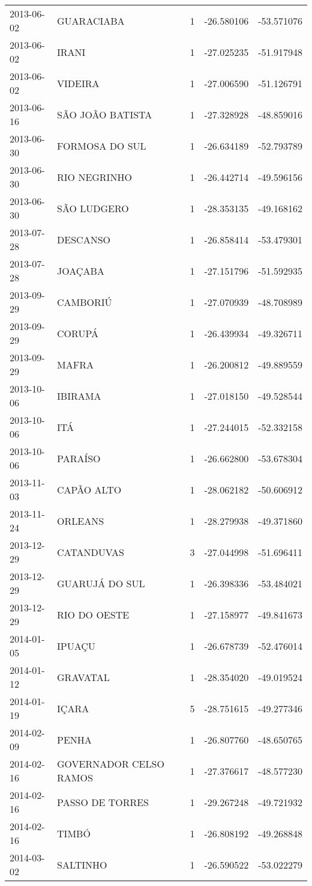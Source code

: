 \documentclass[
	12pt,				%
	openright,			%
	oneside,			%
	a4paper,			%
	english,			%
	french,				%
	spanish,			%
	brazil				%
	dvipsnames, table]{abntex2}
\begin{document}
\begin{longtable}[htbp]{llcrr}
2013-06-02 & GUARACIABA & 1 & -26.580106 & -53.571076 \\
2013-06-02 & IRANI & 1 & -27.025235 & -51.917948 \\
2013-06-02 & VIDEIRA & 1 & -27.006590 & -51.126791 \\
2013-06-16 & SÃO JOÃO BATISTA & 1 & -27.328928 & -48.859016 \\
2013-06-30 & FORMOSA DO SUL & 1 & -26.634189 & -52.793789 \\
2013-06-30 & RIO NEGRINHO & 1 & -26.442714 & -49.596156 \\
2013-06-30 & SÃO LUDGERO & 1 & -28.353135 & -49.168162 \\
2013-07-28 & DESCANSO & 1 & -26.858414 & -53.479301 \\
2013-07-28 & JOAÇABA & 1 & -27.151796 & -51.592935 \\
2013-09-29 & CAMBORIÚ & 1 & -27.070939 & -48.708989 \\
2013-09-29 & CORUPÁ & 1 & -26.439934 & -49.326711 \\
2013-09-29 & MAFRA & 1 & -26.200812 & -49.889559 \\
2013-10-06 & IBIRAMA & 1 & -27.018150 & -49.528544 \\
2013-10-06 & ITÁ & 1 & -27.244015 & -52.332158 \\
2013-10-06 & PARAÍSO & 1 & -26.662800 & -53.678304 \\
2013-11-03 & CAPÃO ALTO & 1 & -28.062182 & -50.606912 \\
2013-11-24 & ORLEANS & 1 & -28.279938 & -49.371860 \\
2013-12-29 & CATANDUVAS & 3 & -27.044998 & -51.696411 \\
2013-12-29 & GUARUJÁ DO SUL & 1 & -26.398336 & -53.484021 \\
2013-12-29 & RIO DO OESTE & 1 & -27.158977 & -49.841673 \\
2014-01-05 & IPUAÇU & 1 & -26.678739 & -52.476014 \\
2014-01-12 & GRAVATAL & 1 & -28.354020 & -49.019524 \\
2014-01-19 & IÇARA & 5 & -28.751615 & -49.277346 \\
2014-02-09 & PENHA & 1 & -26.807760 & -48.650765 \\
2014-02-16 & GOVERNADOR CELSO RAMOS & 1 & -27.376617 & -48.577230 \\
2014-02-16 & PASSO DE TORRES & 1 & -29.267248 & -49.721932 \\
2014-02-16 & TIMBÓ & 1 & -26.808192 & -49.268848 \\
2014-03-02 & SALTINHO & 1 & -26.590522 & -53.022279 \\

\end{longtable}
\end{document}
